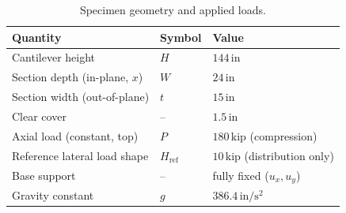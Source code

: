 \documentclass[11pt]{article}
\newcommand{\unit}[1]{\,\mathrm{#1}}
\begin{document}
\begin{table}[H]
\centering
\caption{Specimen geometry and applied loads.}
\begin{tabular}{l l l}
\toprule
Quantity & Symbol & Value \\
\midrule
Cantilever height            & $H$        & $144\unit{in}$ \\
Section depth (in-plane, $x$)& $W$        & $24\unit{in}$ \\
Section width (out-of-plane) & $t$        & $15\unit{in}$ \\
Clear cover                  & --         & $1.5\unit{in}$ \\
Axial load (constant, top)   & $P$        & $180\unit{kip}$ (compression) \\
Reference lateral load shape & $H_\mathrm{ref}$ & $10\unit{kip}$ (distribution only) \\
Base support                 & --         & fully fixed ($u_x,u_y$) \\
Gravity constant             & $g$        & $386.4\unit{in/s^2}$ \\
\bottomrule
\end{tabular}
\end{table}
\end{document}
